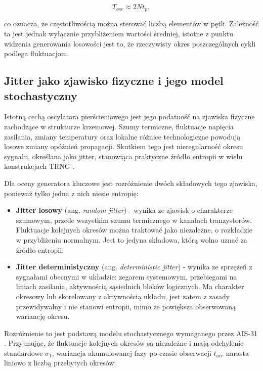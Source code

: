 \begin{equation}
  T_{osc} \approx 2 N t_p ,
  \label{eq:okres-oscylatora}
\end{equation}

co oznacza, że częstotliwością można sterować liczbą elementów w pętli.
Zależność ta jest jednak wyłącznie przybliżeniem wartości średniej, istotne
z punktu widzenia generowania losowości jest to, że rzeczywisty okres
poszczególnych cykli podlega fluktuacjom.

\subsection{Jitter jako zjawisko fizyczne i jego model stochastyczny}

Istotną cechą oscylatora pierścieniowego jest jego podatność na zjawiska
fizyczne zachodzące w strukturze krzemowej. Szumy termiczne, fluktuacje
napięcia zasilania, zmiany temperatury oraz lokalne różnice technologiczne
powodują losowe zmiany opóźnień propagacji. Skutkiem tego jest
nieregularność okresu sygnału, określana jako jitter, stanowiąca praktyczne
źródło entropii w wielu konstrukcjach
TRNG \cite{sunar2006provably,saarinen2021entropy}.

Dla oceny generatora kluczowe jest rozróżnienie dwóch składowych tego
zjawiska, ponieważ tylko jedna z nich niesie entropię:

\begin{itemize}
  \item \textbf{Jitter losowy} (ang. \emph{random jitter}) - wynika ze
        zjawisk o charakterze szumowym, przede wszystkim szumu termicznego
        w kanałach tranzystorów. Fluktuacje kolejnych okresów można
        traktować jako niezależne, o rozkładzie w przybliżeniu normalnym.
        Jest to jedyna składowa, którą wolno uznać za źródło entropii.
  \item \textbf{Jitter deterministyczny} (ang. \emph{deterministic jitter}) -
        wynika ze sprzężeń z sygnałami obecnymi w układzie: zegarem
        systemowym, przebiegami na liniach zasilania, aktywnością sąsiednich
        bloków logicznych. Ma charakter okresowy lub skorelowany
        z aktywnością układu, jest zatem z zasady przewidywalny i nie
        stanowi entropii, mimo że powiększa obserwowaną wariancję okresu.
\end{itemize}

Rozróżnienie to jest podstawą modelu stochastycznego wymaganego przez
AIS-31 \cite{killmann2011ais31}. Przyjmując, że fluktuacje kolejnych okresów
są niezależne i mają odchylenie standardowe $\sigma_1$, wariancja
akumulowanej fazy po czasie obserwacji $t_{acc}$ narasta liniowo z liczbą
przebytych okresów:

